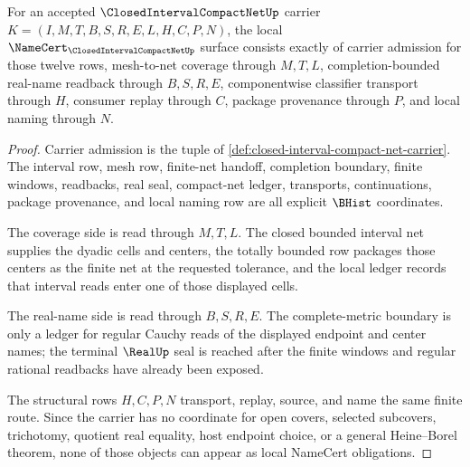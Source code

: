 \begin{theorem}
\label{thm:closed-interval-compact-net-namecert-obligations}
For an accepted $\ClosedIntervalCompactNetUp$ carrier $K=(I,M,T,B,S,R,E,L,H,C,P,N)$, the local $\NameCert_{\ClosedIntervalCompactNetUp}$ surface consists exactly of carrier admission for those twelve rows, mesh-to-net coverage through $M,T,L$, completion-bounded real-name readback through $B,S,R,E$, componentwise classifier transport through $H$, consumer replay through $C$, package provenance through $P$, and local naming through $N$.
\end{theorem}
\begin{proof}
Carrier admission is the tuple of \autoref{def:closed-interval-compact-net-carrier}. The interval row, mesh row, finite-net handoff, completion boundary, finite windows, readbacks, real seal, compact-net ledger, transports, continuations, package provenance, and local naming row are all explicit $\BHist$ coordinates.

The coverage side is read through $M,T,L$. The closed bounded interval net supplies the dyadic cells and centers, the totally bounded row packages those centers as the finite net at the requested tolerance, and the local ledger records that interval reads enter one of those displayed cells.

The real-name side is read through $B,S,R,E$. The complete-metric boundary is only a ledger for regular Cauchy reads of the displayed endpoint and center names; the terminal $\RealUp$ seal is reached after the finite windows and regular rational readbacks have already been exposed.

The structural rows $H,C,P,N$ transport, replay, source, and name the same finite route. Since the carrier has no coordinate for open covers, selected subcovers, trichotomy, quotient real equality, host endpoint choice, or a general Heine--Borel theorem, none of those objects can appear as local NameCert obligations.
\end{proof}

